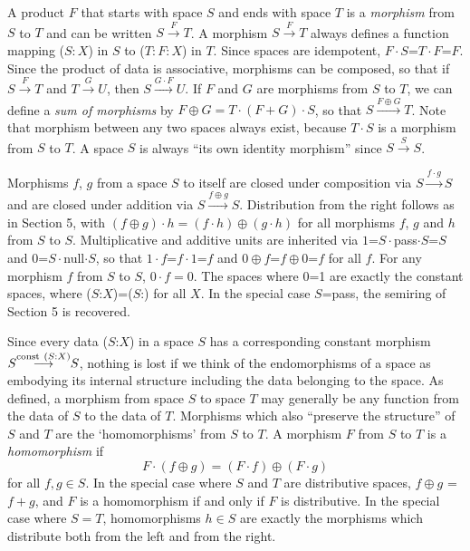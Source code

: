 \documentclass[11pt]{article}
\begin{document}
A product $F$ that starts with space $S$ and ends with space $T$ is a {\it morphism} from $S$ to $T$ and can be written $S{\overset F\longrightarrow}T$.
A morphism $S{\overset F\longrightarrow}T$ always defines a function mapping ($S:X$) in $S$ to ($T:F:X$) in $T$.  
Since spaces are idempotent, $F\cdot S$=$T\cdot F$=$F$.  Since the product of data is 
associative, morphisms can be composed, so that if $S{\overset F\longrightarrow}T$ and 
$T{\overset G\longrightarrow}U$, then $S{\overset {G\cdot F}\longrightarrow}U$.  
If $F$ and $G$ are morphisms from $S$ to $T$, we can define a {\it sum of morphisms} by $F \oplus G = T\cdot (F+G)\cdot S$, so that 
$S{\overset {F\oplus G}\longrightarrow}T$.  Note that morphism between any two spaces always exist, because $T\cdot S$ is a morphism from $S$ to $T$.  
A space $S$ is always ``its own identity morphism'' since $S{\overset S\rightarrow}S$.  

     Morphisms $f$, $g$ from a space $S$ to itself are closed under composition via $S{\overset {f\cdot g}\longrightarrow}S$ and are closed under addition 
via $S{\overset {f\oplus g}\longrightarrow}S$.  
Distribution from the right follows as in Section 5, with 
$(f\oplus g)\cdot h = (f\cdot h)\oplus (g\cdot h)$ for all morphisms $f$, $g$ and $h$ from $S$ to $S$.  
Multiplicative and additive units are inherited via $1$=$S\cdot${\rm pass}$\cdot S$=$S$ and $0$=$S\cdot${\rm null}$\cdot S$, so that 
$1\cdot f$=$f\cdot 1$=$f$ and $0\oplus f$=$f\oplus 0$=$f$ for all $f$.  For any morphism $f$ from $S$ to $S$, $0\cdot f=0$. 
The spaces where 0=1 are exactly the constant spaces, where ($S$:$X$)=($S$:) for all $X$.  In the special case $S$=pass, 
the semiring of Section 5 is recovered. 


        Since every data ($S$:$X$) in a space $S$ has a corresponding constant morphism $S{\overset {{\rm const}\ (S:X)}\longrightarrow}S$, nothing is lost if we think 
 of the endomorphisms of a space as embodying its internal structure including the data belonging to the space.  As defined, a 
 morphism from space $S$ to space $T$ may generally be any function from the data of $S$ to the data of $T$.  
 Morphisms which also ``preserve the structure'' 
 of $S$ and $T$ are the `homomorphisms' from $S$ to $T$.   A morphism $F$ from $S$ to $T$ is a {\it homomorphism} if 
 \begin{equation}
F\cdot (f\oplus g) = (F\cdot f) \oplus (F\cdot g) 
\end{equation}
for all $f,g\in S$.  
In the special case where $S$ and $T$ are distributive spaces, $f\oplus g$ = $f+g$, and 
$F$ is a homomorphism if and only if $F$ is distributive.  In the special case where $S=T$, homomorphisms $h\in S$ are exactly the morphisms 
which distribute both from the left and from the right.  
\end{document}
